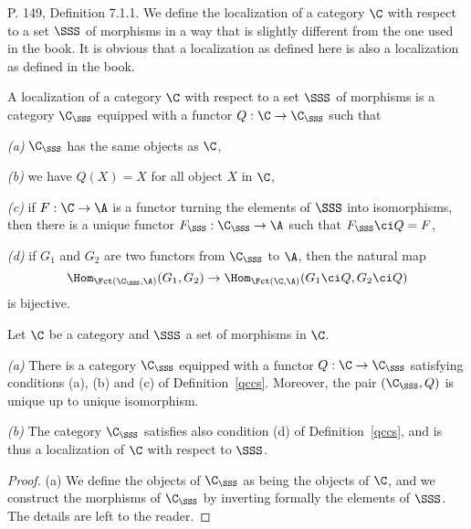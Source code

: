 \documentclass[12pt]{article}
\theoremstyle{remark}
\theoremstyle{definition}
\begin{document}
\begin{s}
P. 149, Definition 7.1.1. We define the localization of a category $\C$ with respect to a set $\SSS$ of morphisms in a way that is slightly different from the one used in the book. It is obvious that a localization as defined here is also a localization as defined in the book.
\begin{df}
A localization of a category $\C$ with respect to a set $\SSS$ of morphisms is a category $\C_\SSS$ equipped with a functor $Q:\C\to\C_\SSS$ such that 

\nn\emph{(a)} $\C_\SSS$ has the same objects as $\C$,

\nn\emph{(b)} we have $Q(X)=X$ for all object $X$ in $\C$,

\nn\emph{(c)} if $F:\C\to\A$ is a functor turning the elements of $\SSS$ into isomorphisms, then there is a unique functor $F_\SSS:\C_\SSS\to\A$ such that $F_\SSS\ci Q=F$,

\nn\emph{(d)} if $G_1$ and $G_2$ are two functors from $\C_\SSS$ to $\A$, then the natural map 
$$
\Hom_{\Fct(\C_\SSS,\A)}(G_1,G_2)\to\Hom_{\Fct(\C,\A)}(G_1\ci Q,G_2\ci Q)
$$
is bijective.
\end{df}
\begin{prop}
Let $\C$ be a category and $\SSS$ a set of morphisms in $\C$.

\nn\emph{(a)} There is a category $\C_\SSS$ equipped with a functor $Q:\C\to\C_\SSS$ satisfying conditions (a), (b) and (c) of Definition~\ref{qccs}. Moreover, the pair $(\C_\SSS,Q)$ is unique up to unique isomorphism. 

\nn\emph{(b)} The category $\C_\SSS$ satisfies also condition (d) of Definition~\ref{qccs}, and is thus a localization of $\C$ with respect to $\SSS$.
\end{prop}

\begin{proof}
(a) We define the objects of $\C_\SSS$ as being the objects of $\C$, and we construct the morphisms of $\C_\SSS$ by inverting formally the elements of $\SSS$. The details are left to the reader.


\end{proof}
\end{s}
\end{document}
